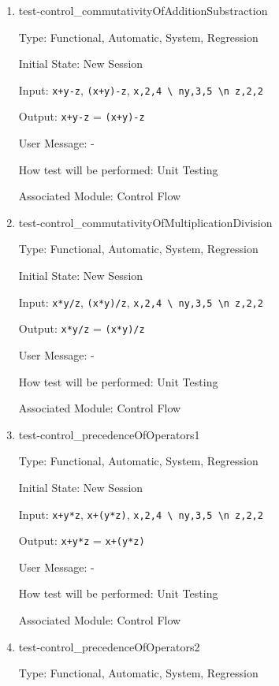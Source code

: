 \documentclass[12pt, titlepage]{article}
\begin{document}
\begin{enumerate}
	
	\item{test-control\_commutativityOfAdditionSubstraction}
	
	Type: Functional, Automatic, System, Regression
	
	Initial State: New Session
	
	Input: \texttt{x+y-z}, \texttt{(x+y)-z}, \texttt{x,2,4 \textbackslash 
	ny,3,5 \textbackslash n z,2,2}
	
	Output: \texttt{x+y-z} = \texttt{(x+y)-z}
	
	User Message: - 
	
	How test will be performed: Unit Testing
	
	Associated Module: Control Flow\\
	
	\item{test-control\_commutativityOfMultiplicationDivision}
	
	Type: Functional, Automatic, System, Regression
	
	Initial State: New Session
	
	Input: \texttt{x*y/z}, \texttt{(x*y)/z}, \texttt{x,2,4 \textbackslash 
	ny,3,5 \textbackslash n z,2,2}
	
	Output: \texttt{x*y/z} = \texttt{(x*y)/z}
	
	User Message: - 
	
	How test will be performed: Unit Testing
	
	Associated Module: Control Flow\\
	
	\item{test-control\_precedenceOfOperators1}
	
	Type: Functional, Automatic, System, Regression
	
	Initial State: New Session
	
	Input: \texttt{x+y*z}, \texttt{x+(y*z)}, \texttt{x,2,4 \textbackslash 
		ny,3,5 \textbackslash n z,2,2}
	
	Output: \texttt{x+y*z} = \texttt{x+(y*z)}
	
	User Message: - 
	
	How test will be performed: Unit Testing
	
	Associated Module: Control Flow\\
	
	\item{test-control\_precedenceOfOperators2}
	
	Type: Functional, Automatic, System, Regression
	

\end{enumerate}
\end{document}
